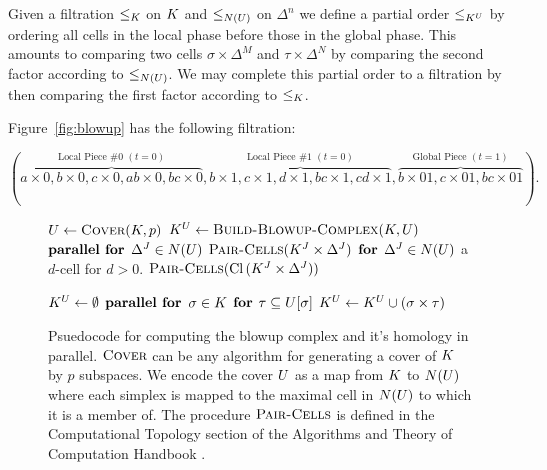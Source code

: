 \documentclass{jocg}
\begin{document}
Given a filtration $\leq_{K}$ on $K$ and $\leq_{N(U)}$ on $\Delta^n$ we define a partial order $\leq_{{K^U}}$ by 
ordering all cells in the local phase before those in the global phase. This amounts to 
comparing two cells $\sigma \times \Delta^M$ and $\tau \times \Delta^N$ by  
comparing the second factor according to $\leq_{N(U)}$. We may complete this partial order to a filtration by then comparing the 
first factor according to $\leq_{K}$. 
\begin{example}
Figure~\ref{fig:blowup} has the following filtration: 
\begin{linenomath*}
\begin{equation*}
(\overbrace{a \times 0, b \times 0 ,c \times 0,  ab \times 0, bc \times 0}^
{\textrm{Local Piece \#0 } (t=0)},
\overbrace{b \times 1 , c \times 1, d \times 1, bc \times 1, cd \times 1}^
{\textrm{Local Piece \#1 }(t=0)},
\overbrace{b \times 01, c \times 01, bc \times 01}^
{\textrm{Global Piece } (t=1)}).
\end{equation*}
\end{linenomath*}
\end{example}
\begin{figure}
\begin{multicols}{2}
{
\begin{codebox}
 \li  $U \gets \textnormal{\scshape Cover}(K, p)$
 \li  $K^{U} \gets \textnormal{\scshape Build-Blowup-Complex}(K, U)$
 \li  $\textbf{parallel for}$   $\Delta^J \in N(U)$
 \li  \Do $\textnormal{\scshape Pair-Cells}(K^{J} \times \Delta^{J})$
      \End
 \li $\textbf{for}$ $\Delta^J \in N(U)$ a $d$-cell for $d > 0$.
 \li  \Do $\textnormal{\scshape Pair-Cells}(\operatorname{Cl}{(K^{J} \times \Delta^{J})})$ 
\end{codebox}
}
{
\begin{codebox}
\li $K^{U} \gets \emptyset$
\li $\textbf{parallel for}$ $\sigma \in K$
\li \Do $\textbf{for}$ $\tau \subseteq U[\sigma]$
\li \Do $K^{U} \gets K^{U} \cup (\sigma \times \tau)$ 
\end{codebox}
}
\end{multicols}
\caption{Psuedocode for computing the blowup complex and it's homology in parallel. $\textnormal{\scshape Cover}$ can be any algorithm for generating a cover of $K$ by $p$ subspaces. We encode the cover $U$ as a map from $K$ to $N(U)$ where each simplex is mapped to the maximal cell in $N(U)$ to which it is a member of. The procedure $\textnormal{\scshape Pair-Cells}$ is defined in the Computational Topology section of the Algorithms and Theory of Computation Handbook \cite{z-ct-10}.}
\label{fig:multicore-code}
\end{figure}
\end{document}
